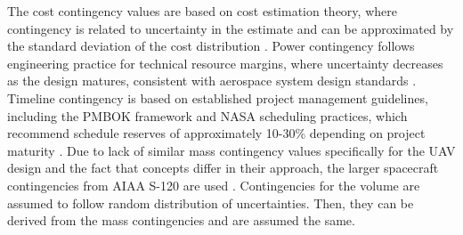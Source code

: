 The cost contingency values are based on cost estimation theory, where contingency is related to uncertainty in the estimate and can be approximated by the standard deviation of the cost distribution \cite{Rothwell2005CostEstimate}. Power contingency follows engineering practice for technical resource margins, where uncertainty decreases as the design matures, consistent with aerospace system design standards \cite{NASA2018SpaceTest}. Timeline contingency is based on established project management guidelines, including the PMBOK framework and NASA scheduling practices, which recommend schedule reserves of approximately 10-30\% depending on project maturity \cite{NASA2020Nasa_schedule_management_hand_book}. Due to lack of similar mass contingency values specifically for the UAV design and the fact that concepts differ in their approach, the larger spacecraft contingencies from AIAA S-120 are used \cite{AmericanInstituteofAeronauticsandAstronautics2015MassSystems}. Contingencies for the volume are assumed to follow random distribution of uncertainties. Then, they can be derived from the mass contingencies and are assumed the same. 
\vspace{-10pt}

